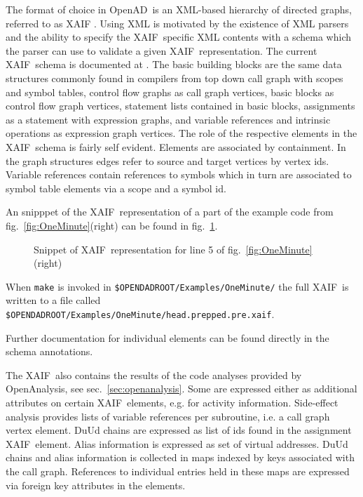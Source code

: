 \documentclass{book}
\newcommand{\OpenAD}{OpenAD}
\newcommand{\OpenAnalysis}{OpenAnalysis}
\newcommand{\xaif}{XAIF}
\newcommand{\refsec}[1]{{sec.~\ref{#1}}}
\newcommand{\reffig}[1]{{fig.~\ref{#1}}}
\begin{document}
The format of choice in \OpenAD\ is an XML-based \cite{xmlWeb} hierarchy of 
directed graphs, referred to as \xaif 
\cite{Hovland2002AXB}. Using XML is motivated by the existence of XML parsers and 
the ability to specify the \xaif\ specific XML contents with a schema which 
the parser can use to validate a given \xaif\ representation. 
The current \xaif\ schema is documented at \cite{xaifweb}.
The basic building blocks are the same data structures commonly found 
in compilers from top down call graph with scopes and symbol tables, 
control flow graphs as call graph vertices, basic blocks  as control flow 
graph vertices, statement lists contained in basic blocks, 
assignments as a statement with expression graphs,  and variable references 
and intrinsic operations as expression graph vertices. 
The role of the respective elements in the \xaif\ schema is fairly self evident. 
Elements are associated by containment. In the graph structures edges 
refer to source and target vertices by vertex ids. 
Variable references contain references to symbols which in turn 
are associated to symbol table elements via a scope and a symbol id. 

An snipppet of the \xaif\ representation of a part of the 
example code  from \reffig{fig:OneMinute}(right) can be found in  
\reffig{fig:wtxxtwXaif}. 
\begin{figure}[h]
\small
{}

  \caption{Snippet of \xaif\ representation for line 5 of \reffig{fig:OneMinute}(right)}\label{fig:wtxxtwXaif}
\end{figure}
When \lstinline{make} is invoked in \lstinline{$OPENDADROOT/Examples/OneMinute/}%
the full \xaif\ is written to a file called \lstinline{$OPENDADROOT/Examples/OneMinute/head.prepped.pre.xaif}.%

Further documentation for individual elements can be found directly in the 
schema annotations. 

The \xaif\ also contains the results of the code analyses provided 
by \OpenAnalysis, see \refsec{sec:openanalysis}. Some are expressed 
either as additional attributes on certain \xaif\ elements, e.g. for activity information. 
Side-effect analysis provides lists of variable references per subroutine, i.e. a call graph vertex element.
DuUd chains are expressed as list of ids found in the assignment \xaif\ element.
Alias information is expressed as set of virtual addresses. 
DuUd chains and alias information is collected in maps indexed by keys associated with the call 
graph. References to individual entries held in these maps are expressed via foreign key 
attributes in the elements. 
\end{document}
